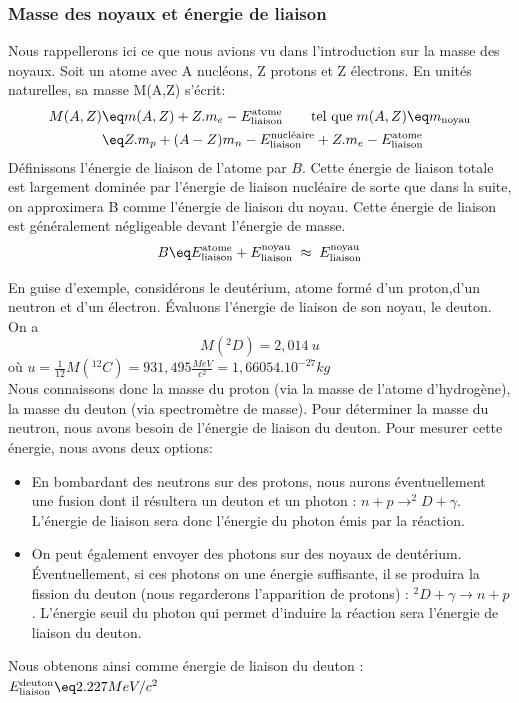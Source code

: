 \subsubsection{Masse des noyaux et énergie de liaison}


Nous rappellerons ici ce que nous avions vu dans l'introduction sur la masse des noyaux. Soit un atome avec A nucléons, Z protons et Z électrons. En unités naturelles, sa masse M(A,Z) s'écrit:
\begin{align*}
    M(A,Z) 
    &\eq
    m(A,Z) + Z.m_e - E^{\text{atome}}_{\text{liaison}} \qquad \text{tel que} \; m(A,Z) \eq m_{\text{noyau}}\\
    &\eq
    Z.m_p + (A-Z)m_n - E^{\text{nucléaire}}_{\text{liaison}} + Z.m_e - E^{\text{atome}}_{\text{liaison}}
\end{align*}
Définissons l'énergie de liaison de l'atome par $B$. Cette énergie de liaison totale est largement dominée par l'énergie de liaison nucléaire de sorte que dans la suite, on approximera B comme l'énergie de liaison du noyau. Cette énergie de liaison est généralement négligeable devant l'énergie de masse.
\begin{equation*}
    B \eq
    E^{\text{atome}}_{\text{liaison}}+E^{\text{noyau}}_{\text{liaison}}
    \;\approx\; E^{\text{noyau}}_{\text{liaison}}
\end{equation*}

En guise d'exemple, considérons le deutérium, atome formé d'un proton,d'un neutron et d'un électron. Évaluons l'énergie de liaison de son noyau, le deuton. On a 
    \begin{equation*}
        M(^{2}D)=2,014~u
    \end{equation*} 
où $u=\frac{1}{12}M(^{12}_{}C)=931,495\frac{MeV}{c^2}=1,66054.10^{-27}kg$\\[0,2cm]
Nous connaissons donc la masse du proton (via la masse de l'atome d'hydrogène), la masse du deuton (via spectromètre de masse). Pour déterminer la masse du neutron, nous avons besoin de l'énergie de liaison du deuton. Pour mesurer cette énergie, nous avons deux options:
\begin{itemize}[label=$\bullet$]
    \item En bombardant des neutrons sur des protons, nous aurons éventuellement une fusion dont il résultera un deuton et un photon : $n+p \rightarrow ^2D+\gamma$. L'énergie de liaison sera donc l'énergie du photon émis par la réaction.
    
    \item On peut également envoyer des photons sur des noyaux de deutérium. Éventuellement, si ces photons on une énergie suffisante, il se produira la fission du deuton (nous regarderons l'apparition de protons) : $^2D+\gamma \rightarrow n+p$. L'énergie seuil du photon qui permet d'induire la réaction sera l'énergie de liaison du deuton.
\end{itemize}
Nous obtenons ainsi comme énergie de liaison du deuton : $E^{\text{deuton}}_{\text{liaison}} \eq 2.227MeV/c^2$


